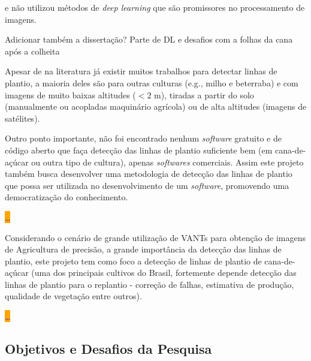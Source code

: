 \documentclass[12pt, a4paper, english, brazil]{article}
\newcommand{\textRed}[1]{{{\color{red} #1}}}
\newcommand{\dotsBlue}{\colorbox{orange}{\textcolor{blue}{\dots}}}
\begin{document}
\textRed{e não utilizou métodos de \textit{deep learning} que são promissores no processamento de imagens}.

\textRed{Adicionar também a dissertação? \cite{Silva_2020} Parte de DL e desafios com a folhas da cana após a colheita}

Apesar de na literatura já existir muitos trabalhos para detectar linhas de plantio, a maioria deles são para outras culturas (e.g., milho e beterraba) e com imagens de muito baixas altitudes ($< 2$ m), tiradas a partir do solo (manualmente ou acopladas maquinário agrícola) ou de alta altitudes (imagens de satélites).

Outro ponto importante, não foi encontrado nenhum \textit{software} gratuito e de código aberto que faça detecção das linhas de plantio suficiente bem (em cana-de-açúcar ou outra tipo de cultura), apenas \textit{softwares} comerciais. Assim este projeto também busca desenvolver uma metodologia de detecção das linhas de plantio que possa ser utilizada no desenvolvimento de um \textit{software}, promovendo uma democratização do conhecimento.

\dotsBlue

Considerando o cenário de grande utilização de VANTs para obtenção de imagens de Agricultura de precisão, a grande importância da detecção das linhas de plantio, este projeto tem como foco a detecção de linhas de plantio de cana-de-açúcar (uma dos principais cultivos do Brasil, fortemente depende detecção das linhas de plantio para o replantio - correção de falhas, estimativa de produção, qualidade de vegetação entre outros).

\dotsBlue


 
\subsection{Objetivos e Desafios da Pesquisa}
\end{document}
